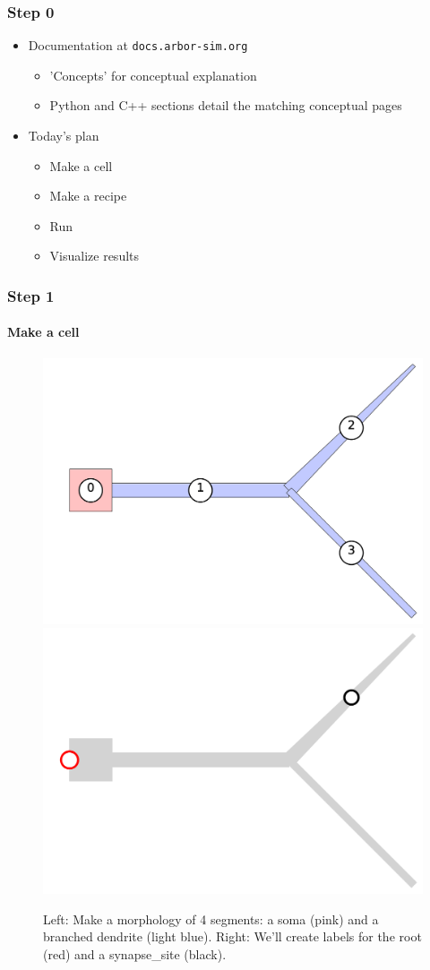 \documentclass[t]{beamer}
\begin{document}
\begin{frame}
    \frametitle{Step 0}
    \begin{itemize}
    \item Documentation at \texttt{docs.arbor-sim.org}
        \begin{itemize}
        \item 'Concepts' for conceptual explanation
        \item Python and C++ sections detail the matching conceptual pages
        \end{itemize}
    \item Today's plan
        \begin{itemize}
        \item Make a cell
        \item Make a recipe
        \item Run
        \item Visualize results
        \end{itemize}
    \end{itemize}
\end{frame}

\begin{frame}
    \frametitle{Step 1}
    \framesubtitle{Make a cell}
    \begin{figure}[h]
        \begin{center}
            \includegraphics[width=0.45\linewidth]{tutorial_network_ring_morph}
            \hspace{2em}
            \includegraphics[width=0.45\linewidth]{tutorial_network_ring_synapse_site}
        \end{center}
        \caption{Left: Make a morphology of 4 segments: a soma (pink) and a branched dendrite (light blue). Right: We’ll create labels for the root (red) and a synapse\_site (black).}
    \end{figure}
\end{frame}
\end{document}
